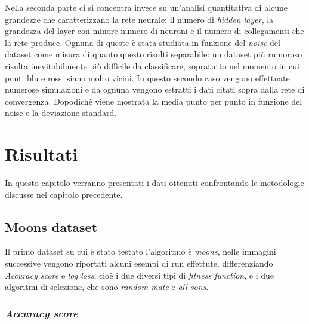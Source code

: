 \documentclass[12pt,a4paper]{report}
\begin{document}
Nella seconda parte ci si concentra invece su un'analisi quantitativa di alcune grandezze che caratterizzano la rete neurale: il numero di \textit{hidden layer}, la grandezza del layer con minore numero di neuroni e il numero di collegamenti che la rete produce.
Ognuna di queste è stata studiata in funzione del \textit{noise} del dataset come misura di quanto questo risulti separabile: un dataset più rumoroso risulta inevitabilmente più difficile da classificare, sopratutto nel momento in cui punti blu e rossi siano molto vicini.
In questo secondo caso vengono effettuate numerose simulazioni e da ognuna vengono estratti i dati citati sopra dalla rete di convergenza.
Dopodichè viene mostrata la media punto per punto in funzione del noise e la deviazione standard.

\chapter{Risultati}

In questo capitolo verranno presentati i dati ottenuti confrontando le  metodologie discusse nel capitolo precedente.

\section{Moons dataset}

Il primo dataset su cui è stato testato l'algoritmo è \textit{moons}, nelle immagini successive vengono riportati alcuni esempi di run effettute, differenziando \textit{Accuracy score} e \textit{log loss}, cioè i due diversi tipi di \textit{fitness function}, e i due algoritmi di selezione, che sono \textit{random mate} e \textit{all sons}.
 
\subsection{\textit{Accuracy score}}
\end{document}
